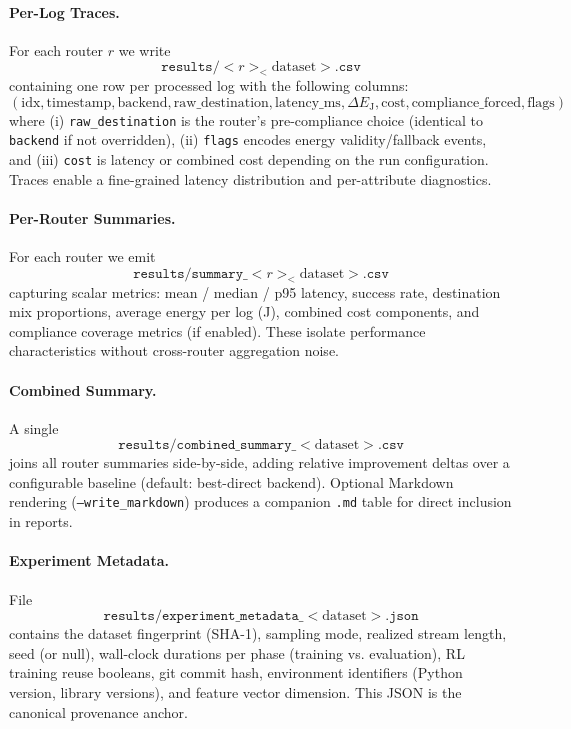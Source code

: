 \paragraph{Per-Log Traces.} For each router $r$ we write
\[
\texttt{results/}<r>_<\text{dataset}>.\texttt{csv}
\]
containing one row per processed log with the following columns:
\[
(\text{idx}, \text{timestamp}, \text{backend}, \text{raw\_destination}, \text{latency\_ms}, \Delta E_{\text{J}}, \text{cost}, \text{compliance\_forced}, \text{flags})
\]
where (i) \texttt{raw\_destination} is the router's pre-compliance choice (identical to \texttt{backend} if not overridden), (ii) \texttt{flags} encodes energy validity/fallback events, and (iii) \texttt{cost} is latency or combined cost depending on the run configuration. Traces enable a fine-grained latency distribution and per-attribute diagnostics.

\paragraph{Per-Router Summaries.} For each router we emit
\[
\texttt{results/summary\_}<r>_<\text{dataset}>.\texttt{csv}
\]
capturing scalar metrics: mean / median / p95 latency, success rate, destination mix proportions, average energy per log (J), combined cost components, and compliance coverage metrics (if enabled). These isolate performance characteristics without cross-router aggregation noise.

\paragraph{Combined Summary.} A single
\[
\texttt{results/combined\_summary\_}<\text{dataset}>.\texttt{csv}
\]
joins all router summaries side-by-side, adding relative improvement deltas over a configurable baseline (default: best-direct backend). Optional Markdown rendering (\texttt{--write\_markdown}) produces a companion \texttt{.md} table for direct inclusion in reports.

\paragraph{Experiment Metadata.} File
\[
\texttt{results/experiment\_metadata\_}<\text{dataset}>.\texttt{json}
\]
contains the dataset fingerprint (SHA-1), sampling mode, realized stream length, seed (or null), wall-clock durations per phase (training vs. evaluation), RL training reuse booleans, git commit hash, environment identifiers (Python version, library versions), and feature vector dimension. This JSON is the canonical provenance anchor.

